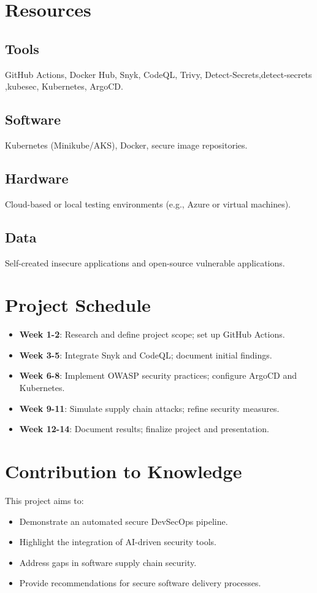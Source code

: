 \documentclass[conference]{IEEEtran}
\begin{document}
\section{Resources}
\subsection{Tools}
GitHub Actions, Docker Hub, Snyk, CodeQL, Trivy, Detect-Secrets,detect-secrets ,kubesec, Kubernetes, ArgoCD.

\subsection{Software}
Kubernetes (Minikube/AKS), Docker, secure image repositories.

\subsection{Hardware}
Cloud-based or local testing environments (e.g., Azure or virtual machines).

\subsection{Data}
Self-created insecure applications and open-source vulnerable applications.

\section{Project Schedule}
\begin{itemize}
    \item \textbf{Week 1-2}: Research and define project scope; set up GitHub Actions.
    \item \textbf{Week 3-5}: Integrate Snyk and CodeQL; document initial findings.
    \item \textbf{Week 6-8}: Implement OWASP security practices; configure ArgoCD and Kubernetes.
    \item \textbf{Week 9-11}: Simulate supply chain attacks; refine security measures.
    \item \textbf{Week 12-14}: Document results; finalize project and presentation.
\end{itemize}

\section{Contribution to Knowledge}
This project aims to:
\begin{itemize}
    \item Demonstrate an automated secure DevSecOps pipeline.
    \item Highlight the integration of AI-driven security tools.
    \item Address gaps in software supply chain security.
    \item Provide recommendations for secure software delivery processes.
\end{itemize}
\end{document}
